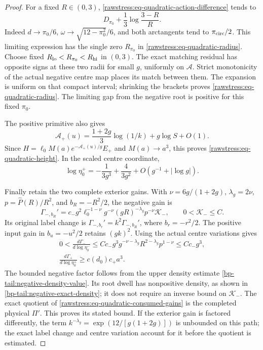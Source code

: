 \begin{proof}
For a fixed \(R\in(0,3)\), \eqref{rawstress:eq-quadratic-action-difference}
tends to
\[
 D_{\pi_0}+\frac13\log\frac{3-R}{R}.
\]
Indeed \(d\to\pi_0/6\),
\(\omega\to\sqrt{12-\pi_0^2}/6\), and both arctangents tend to
\(\pi_{\rm circ}/2\). This limiting expression has the single zero
\(R_{\pi_0}\) in \eqref{rawstress:eq-quadratic-radius}.
Choose fixed \(R_{\rm lo}<R_{\pi_0}<R_{\rm hi}\) in \((0,3)\).
The exact matching residual has opposite signs at these two radii for
small \(g\), uniformly on \(\mathcal A\). Strict monotonicity of the
actual negative centre map places its match between them. The
expansion is uniform on that compact interval; shrinking the brackets
proves \eqref{rawstress:eq-quadratic-radius}. The limiting gap from the
negative root is positive for this fixed \(\pi_0\).

The positive primitive also gives
\[
 \mathcal A_+(u)=\frac{1+2g}{3}\log(1/k)+g\log S+O(1).
\]
Since \(H=\ell_0M(a)e^{-\mathcal A_+(u)/g}E_+\) and
\(M(a)\to a^3\), this proves \eqref{rawstress:eq-quadratic-height}.
In the scaled centre coordinate,
\[
 \log\eta_0^+=-\frac1{3g^3}+\frac4{3g^2}
                                      +O(g^{-1}+|\log g|).
\]

Finally retain the two complete exterior gains. With
\(\nu=6g/(1+2g)\), \(\lambda_g=2\nu\),
\(p=\widehat P(R)/R^2\), and \(b_R=-R^2/2\), the negative gain is
\begin{equation}\label{rawstress:eq-quadratic-full-gain}
 \Gamma_{-,b_R}'=
 c_-g^2\ell_0^{-1-\nu}g^{-\nu}(gR)^{-\lambda_g}
                        p^{-\nu}\mathcal K_-,\qquad
                         0<\mathcal K_-\le C.
\end{equation}
Its original label change is
\(\Gamma_{-,b_r}'=k^2\Gamma_{-,b_R}'\), where \(b_r=-r^2/2\).
The positive input gain in \(b_u=-u^2/2\) retains \((gk)^2\).
Using the actual centre variations gives
\begin{equation}\label{rawstress:eq-quadratic-consumed-gains}
 \begin{gathered}
 0<\frac{d\Gamma_-}{d\log\eta_0^-}
 \le Cc_-g^3g^{-\nu-\lambda_g}
                       R^{2-\lambda_g}p^{1-\nu}\le Cc_-g^3,\\
 \frac{d\Gamma_+}{d\log\eta_0^+}\ge c(d_0)c_+a^3.
 \end{gathered}
\end{equation}
The bounded negative factor follows from the upper density estimate
\eqref{bp-tail:negative-density-value}. Its root dwell has nonpositive
density, as shown in \eqref{bp-tail:negative-exact-density}; it does
not require an inverse bound on \(\mathcal K_-\). The exact quotient
of \eqref{rawstress:eq-quadratic-consumed-gains} is the completed
physical \(\Pi'\). This proves its stated bound. If the exterior gain is factored differently, the term
\(k^{-\lambda_g}=\exp(12/[g(1+2g)])\) is unbounded on this path;
the exact label change and centre variation account for it before the
quotient is estimated.
\end{proof}

